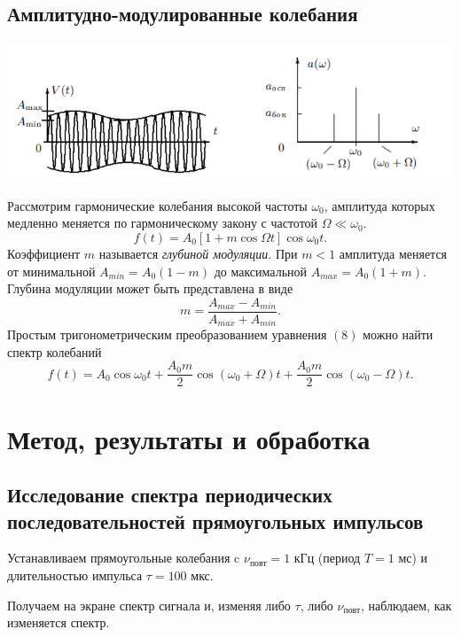 \documentclass[a4paper,12pt]{article}
\begin{document}
\subsection*{Амплитудно-модулированные колебания}
\begin{center}
\includegraphics[scale=0.9]{4.png}
\end{center}
Рассмотрим гармонические колебания высокой частоты $\omega_0$, амплитуда которых медленно меняется по гармоническому закону с частотой $\Omega \ll \omega_0$.
\begin{equation}
f(t) = A_0 \left[1+m\cos \Omega t\right] \cos \omega_0 t.
\end{equation}
Коэффициент $m$ называется \textit{глубиной модуляции}. При $m < 1$ амплитуда меняется от минимальной $A_{min} = A_0(1-m)$ до максимальной $A_{max} = A_0(1+m)$. Глубина модуляции может быть представлена в виде
\begin{equation}
m = \dfrac{A_{max}-A_{min}}{A_{max}+A_{min}}.
\end{equation}
Простым тригонометрическим преобразованием уравнения $(8)$ можно найти спектр колебаний
\begin{equation}
f(t) = A_0 \cos \omega_0t + \dfrac{A_0m}{2} \cos \left(\omega_0 + \Omega\right)t + \dfrac{A_0m}{2}\cos\left(\omega_0 - \Omega\right)t.
\end{equation}
\section*{Метод, результаты и обработка}

\subsection*{Исследование спектра периодических последовательностей прямоугольных импульсов}
Устанавливаем прямоугольные колебания c $\nu_{\text{повт}} = 1$ кГц (период $T = 1$ мс) и длительностью импульса $\tau = 100$ мкс.

Получаем на экране спектр сигнала и, изменяя либо $\tau$, либо $\nu_{\text{повт}}$, наблюдаем, как изменяется спектр.
\end{document}
